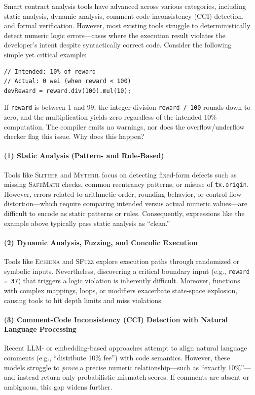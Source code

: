 \documentclass[10pt, conference]{IEEEtran}
\begin{document}
Smart contract analysis tools have advanced across various categories, including static analysis, dynamic analysis, comment-code inconsistency (CCI) detection, and formal verification. However, most existing tools struggle to deterministically detect numeric logic errors—cases where the execution result violates the developer’s intent despite syntactically correct code. Consider the following simple yet critical example:

\begin{lstlisting}[language=Solidity]
// Intended: 10% of reward
// Actual: 0 wei (when reward < 100)
devReward = reward.div(100).mul(10);
\end{lstlisting}

If \texttt{reward} is between 1 and 99, the integer division \texttt{reward / 100} rounds down to zero, and the multiplication yields zero regardless of the intended 10\% computation. The compiler emits no warnings, nor does the overflow/underflow checker flag this issue. Why does this happen?

\paragraph{(1) Static Analysis (Pattern- and Rule-Based)}
Tools like \textsc{Slither} and \textsc{Mythril} focus on detecting fixed-form defects such as missing \textsc{SafeMath} checks, common reentrancy patterns, or misuse of \texttt{tx.origin}. However, errors related to arithmetic order, rounding behavior, or control-flow distortion—which require comparing intended versus actual numeric values—are difficult to encode as static patterns or rules. Consequently, expressions like the example above typically pass static analysis as “clean.”

\paragraph{(2) Dynamic Analysis, Fuzzing, and Concolic Execution}
Tools like \textsc{Echidna} and \textsc{SFuzz} explore execution paths through randomized or symbolic inputs. Nevertheless, discovering a critical boundary input (e.g., \texttt{reward = 37}) that triggers a logic violation is inherently difficult. Moreover, functions with complex mappings, loops, or modifiers exacerbate state-space explosion, causing tools to hit depth limits and miss violations.

\paragraph{(3) Comment-Code Inconsistency (CCI) Detection with Natural Language Processing}
Recent LLM- or embedding-based approaches attempt to align natural language comments (e.g., “distribute 10\% fee”) with code semantics. However, these models struggle to \textit{prove} a precise numeric relationship—such as “exactly 10\%”—and instead return only probabilistic mismatch scores. If comments are absent or ambiguous, this gap widens further.
\end{document}

